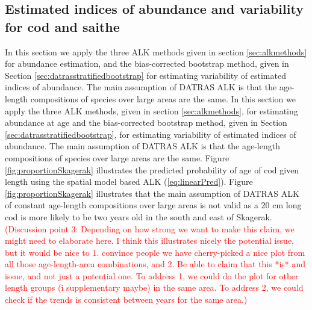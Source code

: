 \documentclass[a4paper 12pt]{article}
\numberwithin{equation}{section}
\newcommand{\ed}[1]{\textcolor{red}{#1}}
\begin{document}
{\subsection{Estimated indices of abundance and variability for cod and saithe}
\label{sec:codresults}
In this section we apply the three ALK methods given in section \ref{sec:alkmethods} for abundance estimation, and the bias-corrected bootstrap method, given in Section \ref{sec:datrasstratifiedbootstrap} for estimating variability of estimated indices of abundance. The main assumption of DATRAS ALK is that the age-length compositions of species over large areas are the same. In this section we apply the three ALK methods, given in section \ref{sec:alkmethods}, for estimating abundance at age and the bias-corrected bootstrap method, given in Section \ref{sec:datrasstratifiedbootstrap}, for estimating variability of estimated indices of abundance.  The main assumption of DATRAS ALK is that the age-length compositions of species over large areas are the same. Figure \ref{fig:proportionSkagerak} illustrates the predicted probability of age of cod given length using the spatial model based ALK  (\ref{eq:linearPred}).  Figure \ref{fig:proportionSkagerak} illustrates that the main assumption of DATRAS ALK of constant age-length compositions over large areas is not valid as a 20 cm long cod is more likely to be two years old in the south and east of Skagerak. \ed{(Discussion point 3: Depending on how strong we want to make this claim, we might need to elaborate here. I think this illustrates nicely the potential issue, but it would be nice to 1. convince people we have cherry-picked a nice plot from all those age-length-area combinations, and 2. Be able to claim that this *is* and issue, and not just a potential one. To address 1, we could do the plot for other length groups (i supplementary maybe) in the same area. To address 2, we could check if the trends is consistent between years for the same area.)}
\clearpage
\begin{figure}[h!]
\centering

\end{figure}}
\end{document}
